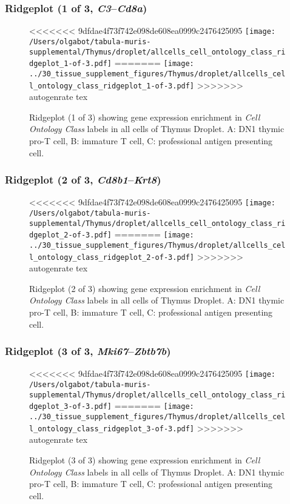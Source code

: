 \subsubsection{Ridgeplot (1 of 3, \emph{C3}--\emph{Cd8a})}
\begin{figure}[h]
\centering
<<<<<<< 9dfdae4f73f742e098de608ea0999c2476425095
\texttt{[image: /Users/olgabot/tabula-muris-supplemental/Thymus/droplet/allcells\_cell\_ontology\_class\_ridgeplot\_1-of-3.pdf]}
=======
\texttt{[image: ../30\_tissue\_supplement\_figures/Thymus/droplet/allcells\_cell\_ontology\_class\_ridgeplot\_1-of-3.pdf]}
>>>>>>> autogenrate tex

\caption{ Ridgeplot (1 of 3)  showing gene expression enrichment in \emph{Cell Ontology Class} labels in all cells of Thymus Droplet. A: DN1 thymic pro-T cell, B: immature T cell, C: professional antigen presenting cell.}
\end{figure}


\clearpage

\subsubsection{Ridgeplot (2 of 3, \emph{Cd8b1}--\emph{Krt8})}
\begin{figure}[h]
\centering
<<<<<<< 9dfdae4f73f742e098de608ea0999c2476425095
\texttt{[image: /Users/olgabot/tabula-muris-supplemental/Thymus/droplet/allcells\_cell\_ontology\_class\_ridgeplot\_2-of-3.pdf]}
=======
\texttt{[image: ../30\_tissue\_supplement\_figures/Thymus/droplet/allcells\_cell\_ontology\_class\_ridgeplot\_2-of-3.pdf]}
>>>>>>> autogenrate tex

\caption{ Ridgeplot (2 of 3)  showing gene expression enrichment in \emph{Cell Ontology Class} labels in all cells of Thymus Droplet. A: DN1 thymic pro-T cell, B: immature T cell, C: professional antigen presenting cell.}
\end{figure}


\clearpage

\subsubsection{Ridgeplot (3 of 3, \emph{Mki67}--\emph{Zbtb7b})}
\begin{figure}[h]
\centering
<<<<<<< 9dfdae4f73f742e098de608ea0999c2476425095
\texttt{[image: /Users/olgabot/tabula-muris-supplemental/Thymus/droplet/allcells\_cell\_ontology\_class\_ridgeplot\_3-of-3.pdf]}
=======
\texttt{[image: ../30\_tissue\_supplement\_figures/Thymus/droplet/allcells\_cell\_ontology\_class\_ridgeplot\_3-of-3.pdf]}
>>>>>>> autogenrate tex

\caption{ Ridgeplot (3 of 3)  showing gene expression enrichment in \emph{Cell Ontology Class} labels in all cells of Thymus Droplet. A: DN1 thymic pro-T cell, B: immature T cell, C: professional antigen presenting cell.}
\end{figure}



